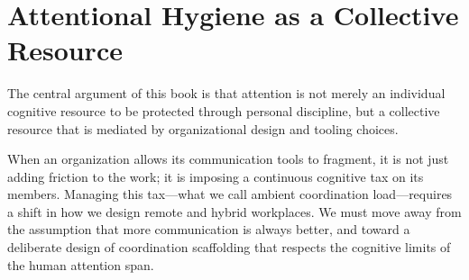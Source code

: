 \section{Attentional Hygiene as a Collective Resource}

The central argument of this book is that attention is not merely an individual cognitive resource to be protected through personal discipline, but a collective resource that is mediated by organizational design and tooling choices. 

When an organization allows its communication tools to fragment, it is not just adding friction to the work; it is imposing a continuous cognitive tax on its members. Managing this tax—what we call ambient coordination load—requires a shift in how we design remote and hybrid workplaces. We must move away from the assumption that more communication is always better, and toward a deliberate design of coordination scaffolding that respects the cognitive limits of the human attention span.
